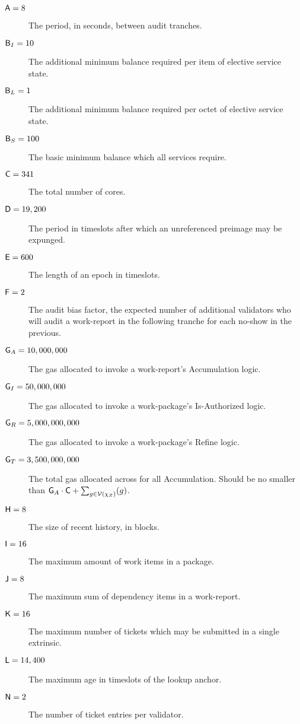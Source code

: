\begin{description}
  \item[$\mathsf{A} = 8$] The period, in seconds, between audit tranches.
  \item[$\mathsf{B}_I = 10$] The additional minimum balance required per item of elective service state.
  \item[$\mathsf{B}_L = 1$] The additional minimum balance required per octet of elective service state.
  \item[$\mathsf{B}_S = 100$] The basic minimum balance which all services require.
  \item[$\mathsf{C} = 341$] The total number of cores.
  \item[$\mathsf{D} = 19,200$] The period in timeslots after which an unreferenced preimage may be expunged.
  \item[$\mathsf{E} = 600$] The length of an epoch in timeslots.
  \item[$\mathsf{F} = 2$] The audit bias factor, the expected number of additional validators who will audit a work-report in the following tranche for each no-show in the previous.
  \item[$\mathsf{G}_A = 10,000,000$] The gas allocated to invoke a work-report's Accumulation logic.
  \item[$\mathsf{G}_I = 50,000,000$] The gas allocated to invoke a work-package's Is-Authorized logic.
  \item[$\mathsf{G}_R = 5,000,000,000$] The gas allocated to invoke a work-package's Refine logic.
  \item[$\mathsf{G}_T = 3,500,000,000$] The total gas allocated across for all Accumulation. Should be no smaller than $\Creportaccgas\cdot\Ccorecount + \sum_{g \in \values{\alwaysaccers}}(g)$.
  \item[$\mathsf{H} = 8$] The size of recent history, in blocks.
  \item[$\mathsf{I} = 16$] The maximum amount of work items in a package.
  \item[$\mathsf{J} = 8$] The maximum sum of dependency items in a work-report.
  \item[$\mathsf{K} = 16$] The maximum number of tickets which may be submitted in a single extrinsic.
  \item[$\mathsf{L} = 14,400$] The maximum age in timeslots of the lookup anchor.
  \item[$\mathsf{N} = 2$] The number of ticket entries per validator.

\end{description}

